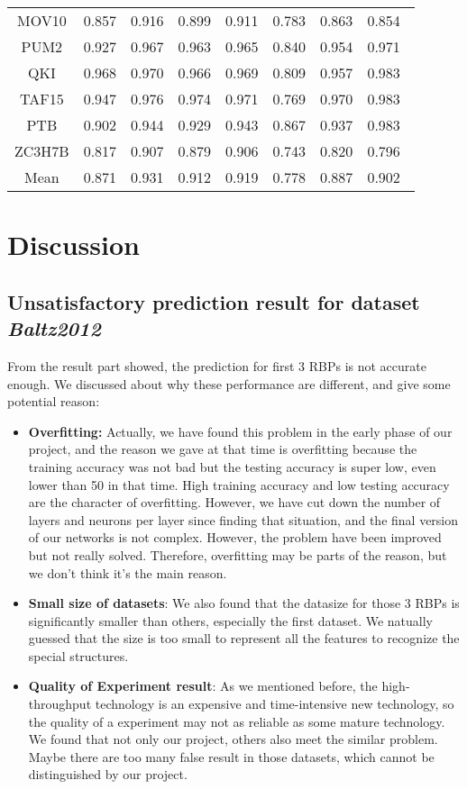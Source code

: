 \documentclass[twoside,twocolumn]{article}
\begin{document}
\begin{table*}
\begin{tabular}{c|ccccccc}
  MOV10    & 0.857 & 0.916 & 0.899 & 0.911 & 0.783 & 0.863 & 0.854 \\
  PUM2     & 0.927 & 0.967 & 0.963 & 0.965 & 0.840 & 0.954 & 0.971 \\
  QKI      & 0.968 & 0.970 & 0.966 & 0.969 & 0.809 & 0.957 & 0.983 \\
  TAF15    & 0.947 & 0.976 & 0.974 & 0.971 & 0.769 & 0.970 & 0.983 \\
  PTB      & 0.902 & 0.944 & 0.929 & 0.943 & 0.867 & 0.937 & 0.983 \\
  ZC3H7B   & 0.817 & 0.907 & 0.879 & 0.906 & 0.743 & 0.820 & 0.796 \\
  Mean     & 0.871 & 0.931 & 0.912 & 0.919 & 0.778 & 0.887 & 0.902 \\
  \bottomrule
  \end{tabular}
  \end{table*}
  


\section{Discussion}

\subsection{Unsatisfactory prediction result for dataset \em Baltz2012}

From the result part showed, the prediction for first 3 RBPs is not accurate enough. We discussed about why these performance are different, and give some potential reason:

\begin{itemize}
    \item \textbf{Overfitting:} Actually, we have found this problem in the early phase of our project, and the reason we gave at that time is overfitting because the training accuracy was not bad but the testing accuracy is super low, even lower than 50 in that time. High training accuracy and low testing accuracy are the character of overfitting. However, we have cut down the number of layers and neurons per layer since finding that situation, and the final version of our networks is not complex. However, the problem have been improved but not really solved. Therefore, overfitting may be parts of the reason, but we don't think it's the main reason.
    \item \textbf{Small size of datasets}: We also found that the datasize for those 3 RBPs is significantly smaller than others, especially the first dataset. We natually guessed that the size is too small to represent all the features to recognize the special structures.
    \item \textbf{Quality of Experiment result}: As we mentioned before, the high-throughput technology is an expensive and time-intensive new technology, so the quality of a experiment may not as reliable as some mature technology. We found that not only our project, others also meet the similar problem. Maybe there are too many false result in those datasets, which cannot be distinguished by our project.
\end{itemize}
\end{document}
